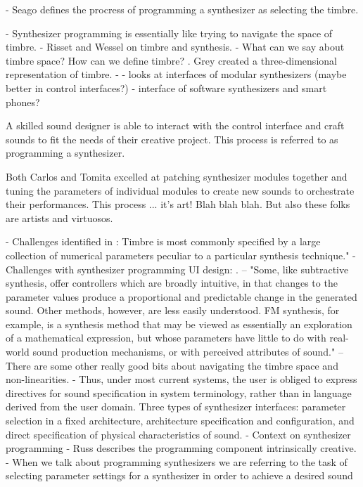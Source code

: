 - Seago defines the procress of programming a synthesizer as selecting the timbre. \cite{seago2004critical}

- Synthesizer programming is essentially like trying to navigate the space of timbre.
- Risset and Wessel \cite{risset1999exploration} on timbre and synthesis.
- What can we say about timbre space? How can we define timbre? \cite{grey1977multidimensional}. Grey created a three-dimensional representation of timbre.
- \cite{bates2021interface} - looks at interfaces of modular synthesizers (maybe better in control interfaces?) 
- \cite{d2016interface} interface of software synthesizers and smart phones?

A skilled sound designer is able to interact with the control interface and craft sounds to fit the needs of their creative project. This process is referred to as programming a synthesizer. 

Both Carlos and Tomita excelled at patching synthesizer modules together and tuning the parameters of individual modules to create new sounds to orchestrate their performances. This process ... it's art! Blah blah blah. But also these folks are artists and virtuosos.

- Challenges identified in \cite{ethington1994seawave}: Timbre is most commonly specified by a large collection of numerical parameters peculiar to a particular synthesis technique."
- Challenges with synthesizer programming UI design: \cite{seago2013new}. -- "Some, like subtractive synthesis, offer controllers which are broadly intuitive, in that changes to the parameter values produce a proportional and predictable change in the generated sound. Other methods, however, are less easily understood. FM synthesis, for example, is a synthesis method that may be viewed as essentially an exploration of a mathematical expression, but whose parameters have little to do with real-world sound production mechanisms, or with perceived attributes of sound." -- There are some other really good bits about navigating the timbre space and non-linearities.
- \cite{seago2004critical} Thus, under most current systems, the user is obliged to express directives for sound specification in system terminology, rather than in language derived from the user domain. Three types of synthesizer interfaces: parameter selection in a fixed architecture, architecture specification and configuration, and direct specification of physical characteristics of sound.
- Context on synthesizer programming \cite{jenkins2019analog}
- Russ describes the programming component intrinsically creative.
- When we talk about programming synthesizers we are referring to the task of selecting parameter settings for a synthesizer in order to achieve a desired sound

